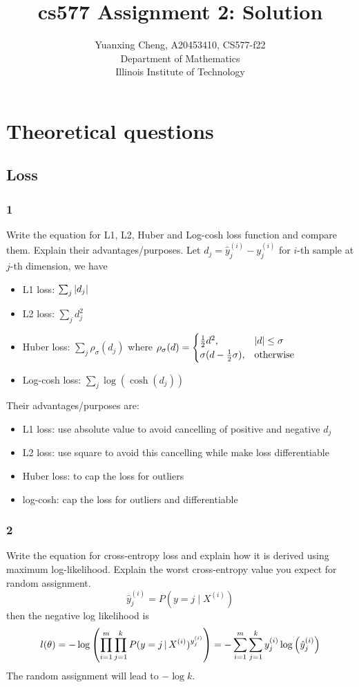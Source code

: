 \documentclass{article}
\title{cs577 Assignment 2: Solution}
\author{Yuanxing Cheng, A20453410, CS577-f22\\ Department of Mathematics \\Illinois Institute of Technology}
\begin{document}
\maketitle

\section*{Theoretical questions}

\subsection*{Loss}
\subsubsection*{1}
\begin{myleftlinebox}
    Write the equation for L1, L2, Huber and Log-cosh loss function and compare them. Explain their advantages/purposes.
    \tcblower
    Let \(d_j=\hat y_j^{(i)}-y_j^{(i)}\) for \(i\)-th sample at \(j\)-th dimension, we have
    \begin{itemize}
        \item L1 loss: \(\sum_j \left\vert d_j\right\vert\)
        \item L2 loss: \(\sum_j d_j^2\)
        \item Huber loss: \(\sum_j \rho_\sigma(d_j)\) where \(\rho_\sigma(d)=\begin{cases}
            \frac{1}{2}d^2, &\left\vert d\right\vert\leq\sigma\\
            \sigma(d-\frac{1}{2}\sigma), &\text{otherwise}
        \end{cases}\)
        \item Log-cosh loss: \(\sum_j \log(\cosh(d_j))\)
    \end{itemize}
    Their advantages/purposes are:
    \begin{itemize}
        \item L1 loss: use absolute value to avoid cancelling of positive and negative \(d_j\)
        \item L2 loss: use square to avoid this cancelling while make loss differentiable
        \item Huber loss: to cap the loss for outliers
        \item log-cosh: cap the loss for outliers and differentiable
    \end{itemize}
\end{myleftlinebox}
\subsubsection*{2}
\begin{myleftlinebox}
    Write the equation for cross-entropy loss and explain how it is derived using maximum log-likelihood. Explain the worst cross-entropy value you expect for random assignment.
    \tcbline
    \[\hat y_j^{(i)}=P(y=j\mid X^{(i)})\]
    then the negative log likelihood is
    \[l(\theta) = -\log\left( \prod_{i=1}^m\prod_{j=1}^k P(y=j\,|\, X^{(i)})^{y_j^{(i)}}  \right)=-\sum_{i=1}^m\sum_{j=1}^k y_j^{(i)}\log\left( \hat y_j^{(i)} \right)  \]
    The random assignment will lead to \(-\log k\).
\end{myleftlinebox}
\end{document}
